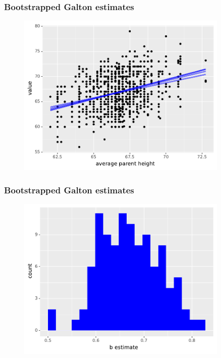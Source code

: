\documentclass[handout]{beamer}
\begin{document}
\begin{frame}
	\frametitle{Bootstrapped Galton estimates}
	
	\begin{figure}[ht]
		\centerline{\includegraphics[width=0.9\textwidth]{../figures/galton_bootstrapped_estimates.pdf}}
	\end{figure}
	
\end{frame}

\begin{frame}
	\frametitle{Bootstrapped Galton estimates}
	
	\begin{figure}[ht]
		\centerline{\includegraphics[width=0.9\textwidth]{../figures/galton_bootstrapped_estimates_histogram.pdf}}
	\end{figure}
	
\end{frame}
\end{document}
